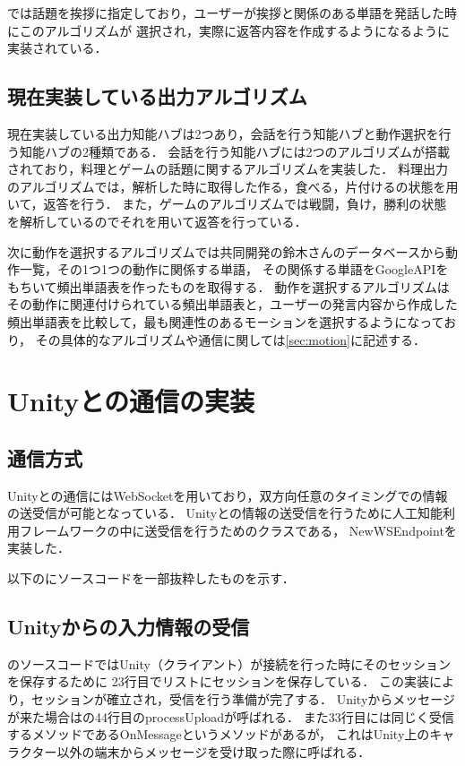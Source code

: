 
では話題を挨拶に指定しており，ユーザーが挨拶と関係のある単語を発話した時にこのアルゴリズムが
選択され，実際に返答内容を作成するようになるように実装されている．

\subsection{現在実装している出力アルゴリズム}\label{sec:back}
現在実装している出力知能ハブは2つあり，会話を行う知能ハブと動作選択を行う知能ハブの2種類である．
会話を行う知能ハブには2つのアルゴリズムが搭載されており，料理とゲームの話題に関するアルゴリズムを実装した．
料理出力のアルゴリズムでは，解析した時に取得した作る，食べる，片付けるの状態を用いて，返答を行う．
また，ゲームのアルゴリズムでは戦闘，負け，勝利の状態を解析しているのでそれを用いて返答を行っている．

次に動作を選択するアルゴリズムでは共同開発の鈴木さんのデータベースから動作一覧，その1つ1つの動作に関係する単語，
その関係する単語をGoogleAPIをもちいて頻出単語表を作ったものを取得する．
動作を選択するアルゴリズムはその動作に関連付けられている頻出単語表と，ユーザーの発言内容から作成した
頻出単語表を比較して，最も関連性のあるモーションを選択するようになっており，
その具体的なアルゴリズムや通信に関しては\ref{sec:motion}に記述する．

\section{Unityとの通信の実装}
\subsection{通信方式}
Unityとの通信にはWebSocketを用いており，双方向任意のタイミングでの情報の送受信が可能となっている．
Unityとの情報の送受信を行うために人工知能利用フレームワークの中に送受信を行うためのクラスである，
NewWSEndpointを実装した．

以下のにソースコードを一部抜粋したものを示す．


\subsection{Unityからの入力情報の受信}
のソースコードではUnity（クライアント）が接続を行った時にそのセッションを保存するために
23行目でリストにセッションを保存している．
この実装により，セッションが確立され，受信を行う準備が完了する．
Unityからメッセージが来た場合はの44行目のprocessUploadが呼ばれる．
また33行目には同じく受信するメソッドであるOnMessageというメソッドがあるが，
これはUnity上のキャラクター以外の端末からメッセージを受け取った際に呼ばれる．

